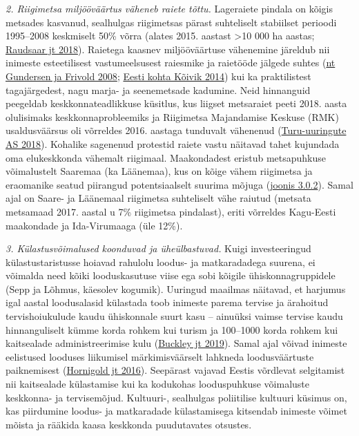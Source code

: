 \documentclass[estonian,]{article}
\begin{document}
\emph{2. Riigimetsa miljööväärtus väheneb raiete tõttu.} Lageraiete pindala on kõigis metsades kasvanud, sealhulgas riigimetsas pärast suhteliselt stabiilset perioodi 1995--2008 keskmiselt 50\% võrra (alates 2015. aastast \textgreater{}10 000 ha aastas; \protect\hyperlink{Raudsaar2018}{Raudsaar jt 2018}). Raietega kaasnev miljööväärtuse vähenemine järeldub nii inimeste esteetilisest vastumeelsusest raiesmike ja raietööde jälgede suhtes (\protect\hyperlink{Gundersen2008}{nt Gundersen ja Frivold 2008}; \protect\hyperlink{Kuxf5ivik2014}{Eesti kohta Kõivik 2014}) kui ka praktilistest tagajärgedest, nagu marja- ja seenemetsade kadumine. Neid hinnanguid peegeldab keskkonnateadlikkuse küsitlus, kus liigset metsaraiet peeti 2018. aasta olulisimaks keskkonnaprobleemiks ja Riigimetsa Majandamise Keskuse (RMK) usaldusväärsus oli võrreldes 2016. aastaga tunduvalt vähenenud (\protect\hyperlink{Turu-uuringute2018}{Turu-uuringute AS 2018}). Kohalike sagenenud protestid raiete vastu näitavad tahet kujundada oma elukeskkonda vähemalt riigimaal. Maakondadest eristub metsapuhkuse võimalustelt Saaremaa (ka Läänemaa), kus on kõige vähem riigimetsa ja eraomanike seatud piirangud potentsiaalselt suurima mõjuga (\protect\hyperlink{figure302}{joonis 3.0.2}). Samal ajal on Saare- ja Läänemaal riigimetsa suhteliselt vähe raiutud (metsata metsamaad 2017. aastal u 7\% riigimetsa pindalast), eriti võrreldes Kagu-Eesti maakondade ja Ida-Virumaaga (üle 12\%).

\emph{3. Külastusvõimalused koonduvad ja üheülbastuvad.} Kuigi investeeringud külastustaristusse hoiavad rahulolu loodus- ja matkaradadega suurena, ei võimalda need kõiki looduskasutuse viise ega sobi kõigile ühiskonnagruppidele (Sepp ja Lõhmus, käesolev kogumik). Uuringud maailmas näitavad, et harjumus igal aastal loodusalasid külastada toob inimeste parema tervise ja ärahoitud tervishoiukulude kaudu ühiskonnale suurt kasu -- ainuüksi vaimse tervise kaudu hinnanguliselt kümme korda rohkem kui turism ja 100--1000 korda rohkem kui kaitsealade administreerimise kulu (\protect\hyperlink{Buckley2019}{Buckley jt 2019}). Samal ajal võivad inimeste eelistused looduses liikumisel märkimisväärselt lahkneda loodusväärtuste paiknemisest (\protect\hyperlink{Hornigold2016}{Hornigold jt 2016}). Seepärast vajavad Eestis võrdlevat selgitamist nii kaitsealade külastamise kui ka kodukohas looduspuhkuse võimaluste keskkonna- ja tervisemõjud. Kultuuri-, sealhulgas poliitilise kultuuri küsimus on, kas piirdumine loodus- ja matkaradade külastamisega kitsendab inimeste võimet mõista ja rääkida kaasa keskkonda puudutavates otsustes.
\end{document}
